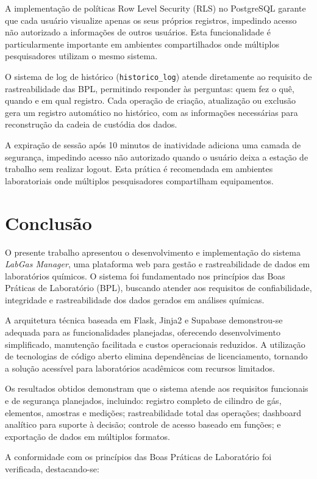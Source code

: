 \documentclass[12pt,a4paper]{article}
\begin{document}
A implementação de políticas Row Level Security (RLS) no PostgreSQL garante que cada usuário visualize apenas os seus próprios registros, impedindo acesso não autorizado a informações de outros usuários. Esta funcionalidade é particularmente importante em ambientes compartilhados onde múltiplos pesquisadores utilizam o mesmo sistema.

O sistema de log de histórico (\texttt{historico\_log}) atende diretamente ao requisito de rastreabilidade das BPL, permitindo responder às perguntas: quem fez o quê, quando e em qual registro. Cada operação de criação, atualização ou exclusão gera um registro automático no histórico, com as informações necessárias para reconstrução da cadeia de custódia dos dados.

A expiração de sessão após 10 minutos de inatividade adiciona uma camada de segurança, impedindo acesso não autorizado quando o usuário deixa a estação de trabalho sem realizar logout. Esta prática é recomendada em ambientes laboratoriais onde múltiplos pesquisadores compartilham equipamentos.

\section{Conclusão}

O presente trabalho apresentou o desenvolvimento e implementação do sistema \textit{LabGas Manager}, uma plataforma web para gestão e rastreabilidade de dados em laboratórios químicos. O sistema foi fundamentado nos princípios das Boas Práticas de Laboratório (BPL), buscando atender aos requisitos de confiabilidade, integridade e rastreabilidade dos dados gerados em análises químicas.

A arquitetura técnica baseada em Flask, Jinja2 e Supabase demonstrou-se adequada para as funcionalidades planejadas, oferecendo desenvolvimento simplificado, manutenção facilitada e custos operacionais reduzidos. A utilização de tecnologias de código aberto elimina dependências de licenciamento, tornando a solução acessível para laboratórios acadêmicos com recursos limitados.

Os resultados obtidos demonstram que o sistema atende aos requisitos funcionais e de segurança planejados, incluindo: registro completo de cilindro de gás, elementos, amostras e medições; rastreabilidade total das operações; dashboard analítico para suporte à decisão; controle de acesso baseado em funções; e exportação de dados em múltiplos formatos.

A conformidade com os princípios das Boas Práticas de Laboratório foi verificada, destacando-se:
\end{document}
